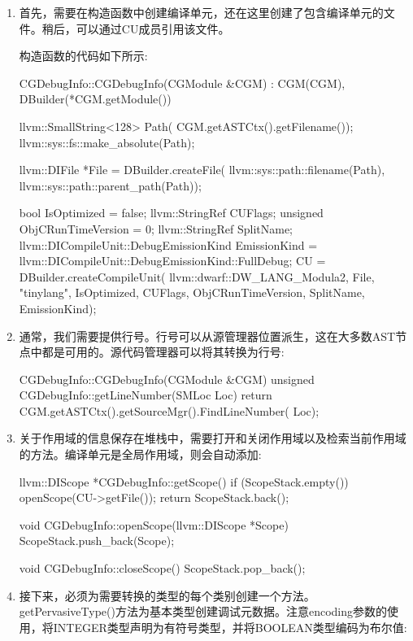 \begin{enumerate}
\item
首先，需要在构造函数中创建编译单元，还在这里创建了包含编译单元的文件。稍后，可以通过CU成员引用该文件。

构造函数的代码如下所示:

\begin{cpp}
CGDebugInfo::CGDebugInfo(CGModule &CGM)
        : CGM(CGM), DBuilder(*CGM.getModule()) {
    llvm::SmallString<128> Path(
        CGM.getASTCtx().getFilename());
    llvm::sys::fs::make_absolute(Path);

    llvm::DIFile *File = DBuilder.createFile(
        llvm::sys::path::filename(Path),
        llvm::sys::path::parent_path(Path));

    bool IsOptimized = false;
    llvm::StringRef CUFlags;
    unsigned ObjCRunTimeVersion = 0;
    llvm::StringRef SplitName;
    llvm::DICompileUnit::DebugEmissionKind EmissionKind =
        llvm::DICompileUnit::DebugEmissionKind::FullDebug;
    CU = DBuilder.createCompileUnit(
        llvm::dwarf::DW_LANG_Modula2, File, "tinylang",
        IsOptimized, CUFlags, ObjCRunTimeVersion,
        SplitName, EmissionKind);
}
\end{cpp}

\item
通常，我们需要提供行号。行号可以从源管理器位置派生，这在大多数AST节点中都是可用的。源代码管理器可以将其转换为行号:

\begin{cpp}
    CGDebugInfo::CGDebugInfo(CGModule &CGM)
unsigned CGDebugInfo::getLineNumber(SMLoc Loc) {
    return CGM.getASTCtx().getSourceMgr().FindLineNumber(
        Loc);
}
\end{cpp}

\item
关于作用域的信息保存在堆栈中，需要打开和关闭作用域以及检索当前作用域的方法。编译单元是全局作用域，则会自动添加:

\begin{cpp}
llvm::DIScope *CGDebugInfo::getScope() {
    if (ScopeStack.empty())
    openScope(CU->getFile());
    return ScopeStack.back();
}

void CGDebugInfo::openScope(llvm::DIScope *Scope) {
    ScopeStack.push_back(Scope);
}

void CGDebugInfo::closeScope() {
    ScopeStack.pop_back();
}
\end{cpp}

\item
接下来，必须为需要转换的类型的每个类别创建一个方法。getPervasiveType()方法为基本类型创建调试元数据。注意encoding参数的使用，将INTEGER类型声明为有符号类型，并将BOOLEAN类型编码为布尔值:


\end{enumerate}
